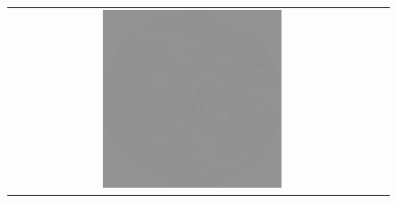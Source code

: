 \documentclass[a4paper,12pt]{article}
\begin{document}
\begin{figure}
\begin{tabular}{cc}
                                                                                                                                                                                                                                                                                                                                                                                                                                                                                                                                                                                                                                                                                                                                                                                                                                 \includegraphics[width=0.5\textwidth]{vismapimbefore.pdf} \\


\end{tabular}
\end{figure}
\end{document}
